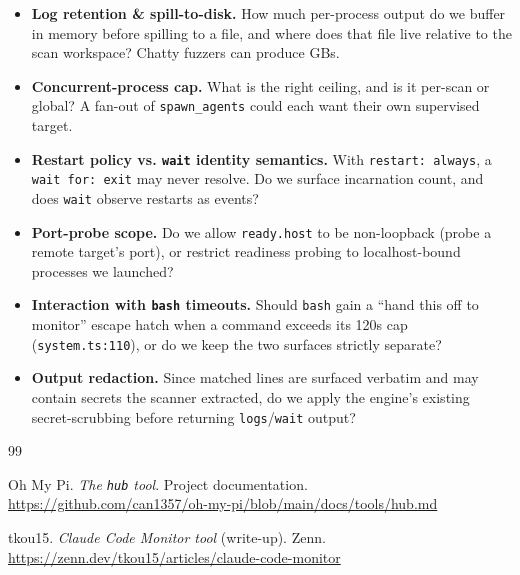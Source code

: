 \documentclass[11pt]{article}
\begin{document}
\begin{itemize}[leftmargin=*]
  \item \textbf{Log retention \& spill-to-disk.} How much per-process output do we
  buffer in memory before spilling to a file, and where does that file live
  relative to the scan workspace? Chatty fuzzers can produce GBs.
  \item \textbf{Concurrent-process cap.} What is the right ceiling, and is it
  per-scan or global? A fan-out of \texttt{spawn\_agents} could each want their own
  supervised target.
  \item \textbf{Restart policy vs. \texttt{wait} identity semantics.} With
  \texttt{restart: always}, a \texttt{wait for: exit} may never resolve. Do we
  surface incarnation count, and does \texttt{wait} observe restarts as events?
  \item \textbf{Port-probe scope.} Do we allow \texttt{ready.host} to be
  non-loopback (probe a remote target's port), or restrict readiness probing to
  localhost-bound processes we launched?
  \item \textbf{Interaction with \texttt{bash} timeouts.} Should \texttt{bash}
  gain a ``hand this off to monitor'' escape hatch when a command exceeds its 120s
  cap (\texttt{system.ts:110}), or do we keep the two surfaces strictly separate?
  \item \textbf{Output redaction.} Since matched lines are surfaced verbatim and
  may contain secrets the scanner extracted, do we apply the engine's existing
  secret-scrubbing before returning \texttt{logs}/\texttt{wait} output?
\end{itemize}

\begin{thebibliography}{99}

Oh My Pi. \textit{The \texttt{hub} tool}. Project documentation.
\url{https://github.com/can1357/oh-my-pi/blob/main/docs/tools/hub.md}

tkou15. \textit{Claude Code Monitor tool} (write-up). Zenn.
\url{https://zenn.dev/tkou15/articles/claude-code-monitor}

\end{thebibliography}
\end{document}
